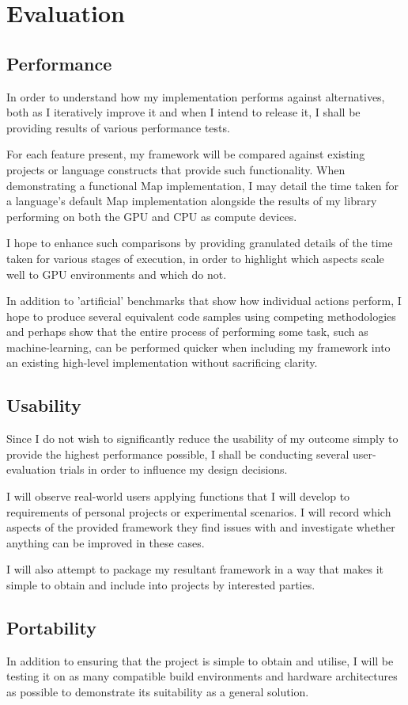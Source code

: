 \section{Evaluation}
\subsection{Performance}
In order to understand how my implementation performs against alternatives, both as I iteratively improve it and when I intend to release it, I shall be providing results of various performance tests.

For each feature present, my framework will be compared against existing projects or language constructs that provide such functionality. When demonstrating a functional Map implementation, I may detail the time taken for a language's default Map implementation alongside the results of my library performing on both the GPU and CPU as compute devices.

I hope to enhance such comparisons by providing granulated details of the time taken for various stages of execution, in order to highlight which aspects scale well to GPU environments and which do not.

In addition to 'artificial' benchmarks that show how individual actions perform, I hope to produce several equivalent code samples using competing methodologies and perhaps show that the entire process of performing some task, such as machine-learning, can be performed quicker when including my framework into an existing high-level implementation without sacrificing clarity.
\subsection{Usability}
Since I do not wish to significantly reduce the usability of my outcome simply to provide the highest performance possible, I shall be conducting several user-evaluation trials in order to influence my design decisions.

I will observe real-world users applying functions that I will develop to requirements of personal projects or experimental scenarios. I will record which aspects of the provided framework they find issues with and investigate whether anything can be improved in these cases.

I will also attempt to package my resultant framework in a way that makes it simple to obtain and include into projects by interested parties.
\subsection{Portability}
In addition to ensuring that the project is simple to obtain and utilise, I will be testing it on as many compatible build environments and hardware architectures as possible to demonstrate its suitability as a general solution.
